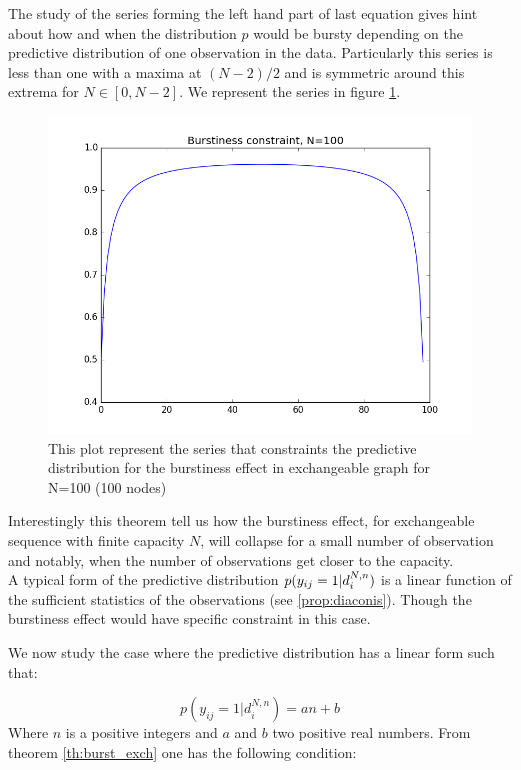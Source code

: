 	The study of the series forming the left hand part of last equation gives hint about how and when the distribution $p$ would be bursty depending on the predictive distribution of one observation in the data. Particularly this series is less than one with a maxima at $(N-2)/2$ and is symmetric around this extrema for $N \in [0, N-2]$. We represent the series in figure \ref{fig:bp}.
	
	
	\begin{figure}[h]
		\centering
		\includegraphics[scale=0.4]{img/bp}
		\caption{This plot represent the series that constraints the predictive distribution for the burstiness effect in exchangeable graph for N=100 (100 nodes)}
		\label{fig:bp}
	\end{figure}



Interestingly this theorem tell us how the burstiness effect, for exchangeable sequence with finite capacity $N$, will collapse for a small number of observation and notably, when the number of observations get closer to the capacity.\\

A typical form of the predictive distribution $p(y_{ij}=1 | d_i^{N,n})$ is a linear function of the sufficient statistics of the observations (see \ref{prop:diaconis}). Though the burstiness effect would have specific constraint in this case.

We now study the case where the predictive distribution has a linear form such that:

\begin{equation}
p(y_{ij}=1 | d_i^{N,n}) = an+b
\end{equation}  
Where $n$ is a positive integers and $a$ and $b$ two positive real numbers. From theorem \ref{th:burst_exch} one has the following condition:

